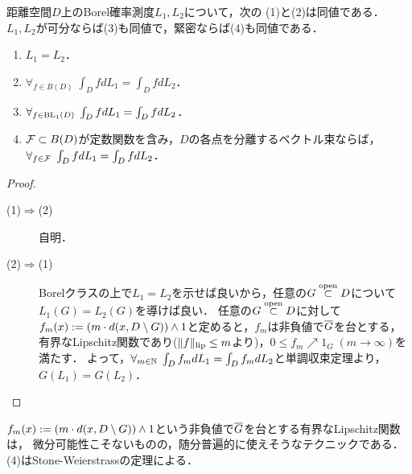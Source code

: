 \documentclass[uplatex,dvipdfmx]{jsreport}
\begin{document}
\begin{lemma}\label{lemma-well-definedness-of-weak-convergence}
    距離空間$D$上のBorel確率測度$L_1,L_2$について，次の
    (1)と(2)は同値である．$L_1,L_2$が可分ならば(3)も同値で，緊密ならば(4)も同値である．
    \begin{enumerate}
        \item $L_1=L_2$．
        \item $\forall_{f\in B(D)}\;\int_DfdL_1=\int_DfdL_2$．
        \item $\forall_{f\in\mathrm{BL}_1(D)}\;\int_DfdL_1=\int_DfdL_2$．
        \item $\mathcal{F}\subset B(D)$が定数関数を含み，$D$の各点を分離するベクトル束ならば，$\forall_{f\in\mathcal{F}}\;\int_DfdL_1=\int_DfdL_2$．
    \end{enumerate}
\end{lemma}
\begin{proof}\mbox{}
    \begin{description}
        \item[(1)$\Rightarrow$(2)] 自明．
        \item[(2)$\Rightarrow$(1)] 
        Borelクラスの上で$L_1=L_2$を示せば良いから，任意の$G\overset{\mathrm{open}}{\subset} D$について$L_1(G)=L_2(G)$を導けば良い．
        任意の$G\overset{\mathrm{open}}{\subset} D$に対して$f_m(x):=\left(m\cdot d(x,D\setminus G)\right)\land 1$と定めると，$f_m$は非負値で$\overline{G}$を台とする，有界なLipschitz関数であり($\|f\|_{\textrm{lip}}\le m$より)，$0\le f_m\nearrow 1_G\;(m\to\infty)$を満たす．
        よって，$\forall_{m\in\mathbb{N}}\;\int_Df_mdL_1=\int_Df_mdL_2$と単調収束定理より，$G(L_1)=G(L_2)$．
    \end{description}
\end{proof}
\begin{remarks}
    $f_m(x):=\left(m\cdot d(x,D\setminus G)\right)\land 1$という非負値で$\overline{G}$を台とする有界なLipschitz関数は，
    微分可能性こそないものの，随分普遍的に使えそうなテクニックである．(4)はStone-Weierstrassの定理による．
\end{remarks}
\end{document}
